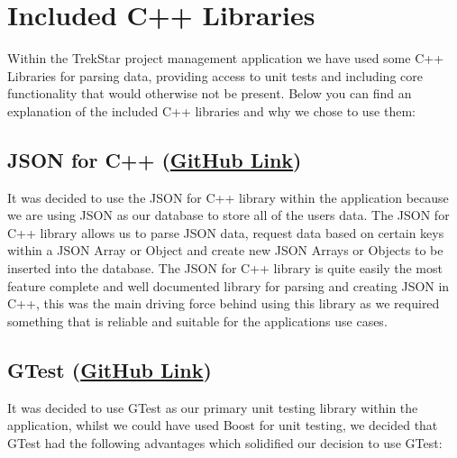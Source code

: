 \documentclass[
  english,
  a4paper,
,tablecaptionabove
]{scrartcl}
\begin{document}
\newpage

\hypertarget{included-c-libraries}{%
\section{Included C++ Libraries}\label{included-c-libraries}}

Within the TrekStar project management application we have used some C++
Libraries for parsing data, providing access to unit tests and including
core functionality that would otherwise not be present. Below you can
find an explanation of the included C++ libraries and why we chose to
use them:

\hypertarget{json-for-c-github-link}{%
\subsection{\texorpdfstring{JSON for C++
(\href{https://github.com/nlohmann/json}{GitHub
Link})}{JSON for C++ (GitHub Link)}}\label{json-for-c-github-link}}

It was decided to use the JSON for C++ library within the application
because we are using JSON as our database to store all of the users
data. The JSON for C++ library allows us to parse JSON data, request
data based on certain keys within a JSON Array or Object and create new
JSON Arrays or Objects to be inserted into the database. The JSON for
C++ library is quite easily the most feature complete and well
documented library for parsing and creating JSON in C++, this was the
main driving force behind using this library as we required something
that is reliable and suitable for the applications use cases.

\hypertarget{gtest-github-link}{%
\subsection{\texorpdfstring{GTest
(\href{https://github.com/google/googletest}{GitHub
Link})}{GTest (GitHub Link)}}\label{gtest-github-link}}

It was decided to use GTest as our primary unit testing library within
the application, whilst we could have used Boost for unit testing, we
decided that GTest had the following advantages which solidified our
decision to use GTest:
\end{document}
